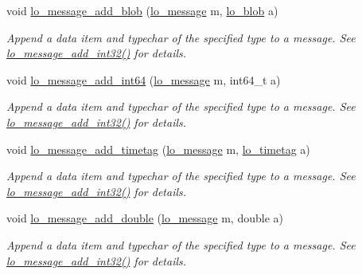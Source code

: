\begin{CompactItemize}
void \hyperlink{group__liblolowlevel_gdd46df28da46be3f526151051410c935}{lo\_\-message\_\-add\_\-blob} (\hyperlink{lo__types_8h_d126083c98d941f00eb72d1690b38d63}{lo\_\-message} m, \hyperlink{lo__types_8h_8e780f8c09e3e4dd737fe249f11d16fc}{lo\_\-blob} a)
\begin{CompactList}\small\item\em Append a data item and typechar of the specified type to a message. See \hyperlink{group__liblolowlevel_g31ac1e4c0ec6c61f665ce3f9bbdc53c3}{lo\_\-message\_\-add\_\-int32()} for details. \item\end{CompactList}\item 
void \hyperlink{group__liblolowlevel_gcc804708784d2ab1397c65bf99403864}{lo\_\-message\_\-add\_\-int64} (\hyperlink{lo__types_8h_d126083c98d941f00eb72d1690b38d63}{lo\_\-message} m, int64\_\-t a)
\begin{CompactList}\small\item\em Append a data item and typechar of the specified type to a message. See \hyperlink{group__liblolowlevel_g31ac1e4c0ec6c61f665ce3f9bbdc53c3}{lo\_\-message\_\-add\_\-int32()} for details. \item\end{CompactList}\item 
void \hyperlink{group__liblolowlevel_g2cbd8e6222b589b3ccb7b47f7ee147cc}{lo\_\-message\_\-add\_\-timetag} (\hyperlink{lo__types_8h_d126083c98d941f00eb72d1690b38d63}{lo\_\-message} m, \hyperlink{structlo__timetag}{lo\_\-timetag} a)
\begin{CompactList}\small\item\em Append a data item and typechar of the specified type to a message. See \hyperlink{group__liblolowlevel_g31ac1e4c0ec6c61f665ce3f9bbdc53c3}{lo\_\-message\_\-add\_\-int32()} for details. \item\end{CompactList}\item 
void \hyperlink{group__liblolowlevel_gd620fb686a8bdaf23e4bbe7a74b2ae66}{lo\_\-message\_\-add\_\-double} (\hyperlink{lo__types_8h_d126083c98d941f00eb72d1690b38d63}{lo\_\-message} m, double a)
\begin{CompactList}\small\item\em Append a data item and typechar of the specified type to a message. See \hyperlink{group__liblolowlevel_g31ac1e4c0ec6c61f665ce3f9bbdc53c3}{lo\_\-message\_\-add\_\-int32()} for details. \item\end{CompactList}\item 

\end{CompactItemize}
